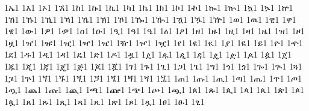 {1ኤ1 %
1እ1 %
1ኦ1 %
1ኧ1 %
1ከ1 %
1ኩ1 %
1ኪ1 %
1ካ1 %
1ኬ1 %
1ክ1 %
1ኮ1 %
1ኯ1 %
1ኰ1 %
1ኲ1 %
1ኳ1 %
1ኴ1 %
1ኵ1 %
1ኸ1 %
1ኹ1 %
1ኺ1 %
1ኻ1 %
1ኼ1 %
1ኽ1 %
1ኾ1 %
1ዀ1 %
1ዂ1 %
1ዃ1 %
1ዄ1 %
1ዅ1 %
1ወ1 %
1ዉ1 %
1ዊ1 %
1ዋ1 %
1ዌ1 %
1ው1 %
1ዎ1 %
1ዏ1 %
1ዐ1 %
1ዑ1 %
1ዒ1 %
1ዓ1 %
1ዔ1 %
1ዕ1 %
1ዖ1 %
1ዘ1 %
1ዙ1 %
1ዚ1 %
1ዛ1 %
1ዜ1 %
1ዝ1 %
1ዞ1 %
1ዟ1 %
1ዠ1 %
1ዡ1 %
1ዢ1 %
1ዣ1 %
1ዤ1 %
1ዥ1 %
1ዦ1 %
1ዧ1 %
1የ1 %
1ዩ1 %
1ዪ1 %
1ያ1 %
1ዬ1 %
1ይ1 %
1ዮ1 %
1ዯ1 %
1ደ1 %
1ዱ1 %
1ዲ1 %
1ዳ1 %
1ዴ1 %
1ድ1 %
1ዶ1 %
1ዷ1 %
1ዸ1 %
1ዹ1 %
1ዺ1 %
1ዻ1 %
1ዼ1 %
1ዽ1 %
1ዾ1 %
1ዿ1 %
1ጀ1 %
1ጁ1 %
1ጂ1 %
1ጃ1 %
1ጄ1 %
1ጅ1 %
1ጆ1 %
1ጇ1 %
1ገ1 %
1ጉ1 %
1ጊ1 %
1ጋ1 %
1ጌ1 %
1ግ1 %
1ጎ1 %
1ጏ1 %
1ጐ1 %
1ጒ1 %
1ጓ1 %
1ጔ1 %
1ጕ1 %
1ጘ1 %
1ጙ1 %
1ጚ1 %
1ጛ1 %
1ጜ1 %
1ጝ1 %
1ጞ1 %
1ጟ1 %
1ጠ1 %
1ጡ1 %
1ጢ1 %
1ጣ1 %
1ጤ1 %
1ጥ1 %
1ጦ1 %
1ጧ1 %
1ጨ1 %
1ጩ1 %
1ጪ1 %
1ጫ1 %
1ጬ1 %
1ጭ1 %
1ጮ1 %
1ጯ1 %
1ጰ1 %
1ጱ1 %
1ጲ1 %
1ጳ1 %
1ጴ1 %
1ጵ1 %
1ጶ1 %
1ጷ1 %
1ጸ1 %
1ጹ1 %
1ጺ1 %
1ጻ1 %
1ጼ1 %
1ጽ1 %
1ጾ1 %
1ጿ1 %
1ፀ1 %
1ፁ1 %
1ፂ1 %
}
